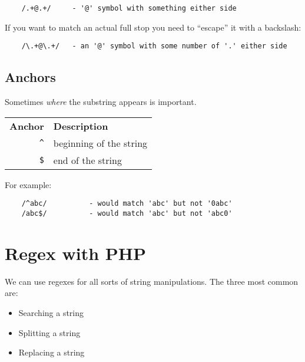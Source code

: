 \begin{verbatim}
    /.+@.+/     - '@' symbol with something either side
\end{verbatim}

If you want to match an actual full stop you need to ``escape'' it with a backslash:

\begin{verbatim}
    /\.+@\.+/   - an '@' symbol with some number of '.' either side
\end{verbatim}



\subsection{Anchors}

Sometimes \textit{where} the substring appears is important.

\begin{center}
    \begin{small}
        \begin{tabularx}{\textwidth}{r l}
            \textbf{Anchor}             & \textbf{Description} \\
            \texttt{\textasciicircum}   & beginning of the string \\
            \texttt{\$}                 & end of the string \\
        \end{tabularx}
    \end{small}
\end{center}

For example:

\begin{verbatim}
    /^abc/          - would match 'abc' but not '0abc'
    /abc$/          - would match 'abc' but not 'abc0'
\end{verbatim}


\section{Regex with PHP}

We can use regexes for all sorts of string manipulations. The three most common are:

\begin{itemize}
    \item Searching a string
    \item Splitting a string
    \item Replacing a string
\end{itemize}


